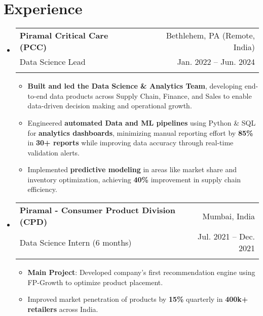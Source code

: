 \documentclass[letter paper,11pt]{article}
\makeatletter
\newcommand{\resumeItem}[1]{
\justifying
\vspace{-3pt}
  \item\small{
    {#1}
  }
}
\newcommand{\resumeSubheading}[5]{%
  \item
    \begin{tabular*}
    {1\textwidth}
    {l@{\extracolsep{\fill}}r}
      \textbf{#1} & \small#2 \\
      {\small#3} & {\small #4} \\
      {\small#5}
    \end{tabular*}%
  \vspace{-0.95cm}
}
\newcommand{\resumeSubHeadingListStart}{\begin{itemize}[leftmargin=0.0in, label={}]}
\newcommand{\resumeSubHeadingListEnd}{\end{itemize}}
\newcommand{\resumeItemListStart}{\begin{itemize}}
\newcommand{\resumeItemListEnd}{\end{itemize}}
\makeatother
\begin{document}
\section{Experience}
  \resumeSubHeadingListStart
    \resumeSubheading
    {Piramal Critical Care (PCC)}
    {Bethlehem, PA (Remote, India)}
    {Data Science Lead}
    {Jan. 2022 -- Jun. 2024}{}
    
    \resumeItemListStart
    \resumeItem{\textbf{Built and led the Data Science \& Analytics Team}, developing end-to-end data products across Supply Chain, Finance, and Sales to enable data-driven decision making and operational growth.}
    \resumeItem{Engineered \textbf{automated Data and ML pipelines} using Python \& SQL for \textbf{analytics dashboards}, minimizing manual reporting effort by \textbf{85\%} in \textbf{30+ reports} while improving data accuracy through real-time validation alerts.}
    \resumeItem{Implemented \textbf{predictive modeling} in areas like market share and inventory optimization, achieving \textbf{40\%} improvement in supply chain efficiency.
    }
    
    \resumeItemListEnd

    \vspace{-10px}
    \resumeSubheading
    {\textbf{Piramal - Consumer Product Division (CPD)}}{Mumbai, India}
    {Data Science Intern (6 months)}{Jul. 2021 -- Dec. 2021}{}
    
    \resumeItemListStart
    \resumeItem{\textbf{Main Project}: Developed company's first recommendation engine using FP-Growth to optimize product placement.}
\resumeItem{Improved market penetration of products by \textbf{15\%} quarterly in \textbf{400k+ retailers} across India.}

    \resumeItemListEnd
\resumeSubHeadingListEnd



\end{document}

